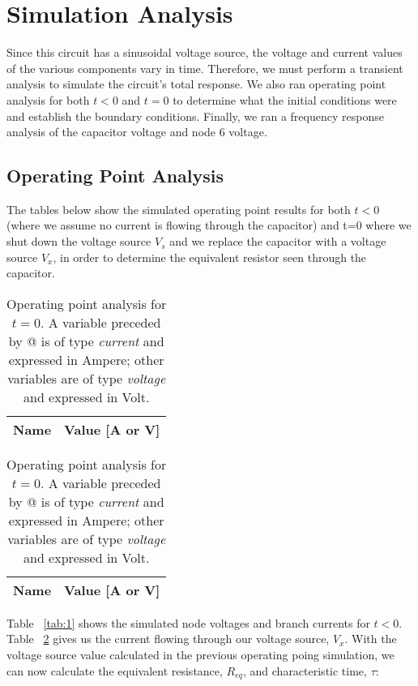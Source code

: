 \newpage
\section{Simulation Analysis}
\label{sec:simulation}
Since this circuit has a sinusoidal voltage source, the voltage and current values of the various components vary in time. Therefore, we must perform a transient analysis to simulate the circuit's total response. We also ran operating point analysis for both $t<0$ and $t=0$ to determine what the initial conditions were and establish the boundary conditions. Finally, we ran a frequency response analysis of the capacitor voltage and node 6 voltage.
\subsection{Operating Point Analysis}
The tables below show the simulated operating point results for both $t<0$ (where we assume no current is flowing through the capacitor) and t=0 where we shut down the voltage source $V_{s}$ and we replace the capacitor with a voltage source $V_{x}$, in order to determine the equivalent resistor seen through the capacitor.
\begin{table}[!htb]
	\begin{minipage}{.5\linewidth}
	\centering
	\begin{tabular}{ll}
	{\bf Name} & {\bf Value [A or V]} \\ \hline
	
	\end{tabular}
	\caption{Operating point analysis for $t<0$. A variable preceded by @ is of type {\em current} other variables are of type {\it voltage} and expressed in Volt.}
	\label{tab:1}
  	\end{minipage}
  	\hfill
	\begin{minipage}{.5\linewidth}
	\centering
  	\begin{tabular}{ll}
   	{\bf Name} & {\bf Value [A or V]} \\ \hline
   	
	\end{tabular}
	\caption{Operating point analysis for $t=0$. A variable preceded by @ is of type {\em current} and expressed in Ampere; other variables are of type {\it voltage} and expressed in Volt.}
	\label{tab:2}
	\end{minipage}
\end{table}

Table ~\ref{tab:1} shows the simulated node voltages and branch currents for $t<0$. Table ~\ref{tab:2} gives us the current flowing through our voltage source, $V_{x}$. With the voltage source value calculated in the previous operating poing simulation, we can now calculate the equivalent resistance, $R_{eq}$, and characteristic time, $\tau$:

